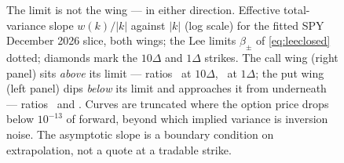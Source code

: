 \begin{figure}[htbp]
\centering
{}
\caption{The limit is not the wing --- in either direction.  Effective
total-variance slope $w(k)/|k|$ against $|k|$ (log scale) for the fitted
SPY December 2026 slice, both wings; the Lee limits $\beta_\pm$ of
\eqref{eq:leeclosed} dotted; diamonds mark the $10\Delta$ and $1\Delta$
strikes.  The call wing (right panel) sits \emph{above} its limit ---
ratios \MacLeeRatioTenDeltaCall\ at $10\Delta$, \MacLeeRatioOneDeltaCall\
at $1\Delta$; the put wing (left panel) dips \emph{below} its limit and
approaches it from underneath --- ratios \MacLeeRatioTenDeltaPut\ and
\MacLeeRatioOneDeltaPut.  Curves are truncated where the option price
drops below $10^{-13}$ of forward, beyond which implied variance is
inversion noise.  The asymptotic slope is a boundary condition on
extrapolation, not a quote at a tradable strike.}
\label{fig:lee}
\end{figure}
